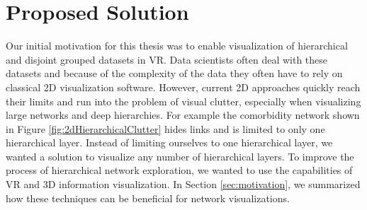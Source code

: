 \chapter{Proposed Solution}
\label{chap:proposed-Solution}

Our initial motivation for this thesis was to enable visualization of hierarchical and disjoint grouped datasets in VR. 
Data scientists often deal with these datasets and because of the complexity of the data they often have to rely on classical 2D visualization software.
However, current 2D approaches quickly reach their limits and run into the problem of visual clutter, especially when visualizing large networks and deep hierarchies. For example the comorbidity network shown in Figure \ref{fig:2dHierarchicalClutter} hides links and is limited to only one hierarchical layer. Instead of limiting ourselves to one hierarchical layer, we wanted a solution to visualize any number of hierarchical layers.
To improve the process of hierarchical network exploration, we wanted to use the capabilities of VR and 3D information visualization. In Section \ref{sec:motivation}, we summarized how these techniques can be beneficial for network visualizations.  

